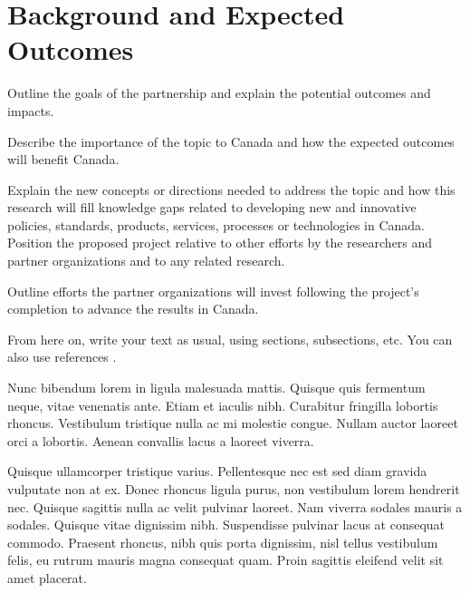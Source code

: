 \documentclass[english]{nserc-alliance}
\begin{document}
\thispagestyle{firstpage}
\maketitle

\section*{Background and Expected Outcomes}
\ifinst\begin{instructions}
\item Outline the goals of the partnership and explain the potential outcomes and impacts.
\item Describe the importance of the topic to Canada and how the expected outcomes will benefit Canada.
\item Explain the new concepts or directions needed to address the topic and how this research will fill knowledge gaps related to developing new and innovative policies, standards, products, services, processes or technologies in Canada. Position the proposed project relative to other efforts by the researchers and partner organizations and to any related research.
\item Outline efforts the partner organizations will invest following the project’s completion to advance the results in Canada.
\end{instructions}\fi

\noindent From here on, write your text as usual, using sections, subsections, etc. You can also use references \cite{DBLPjournals/jsyml/Turing48,DBLPconf/afips/SolomonP76}.

Nunc bibendum lorem in ligula malesuada mattis. Quisque quis fermentum neque, vitae venenatis ante. Etiam et iaculis nibh. Curabitur fringilla lobortis rhoncus. Vestibulum tristique nulla ac mi molestie congue. Nullam auctor laoreet orci a lobortis. Aenean convallis lacus a laoreet viverra.

Quisque ullamcorper tristique varius. Pellentesque nec est sed diam gravida vulputate non at ex. Donec rhoncus ligula purus, non vestibulum lorem hendrerit nec. Quisque sagittis nulla ac velit pulvinar laoreet. Nam viverra sodales mauris a sodales. Quisque vitae dignissim nibh. Suspendisse pulvinar lacus at consequat commodo. Praesent rhoncus, nibh quis porta dignissim, nisl tellus vestibulum felis, eu rutrum mauris magna consequat quam. Proin sagittis eleifend velit sit amet placerat.
\end{document}
